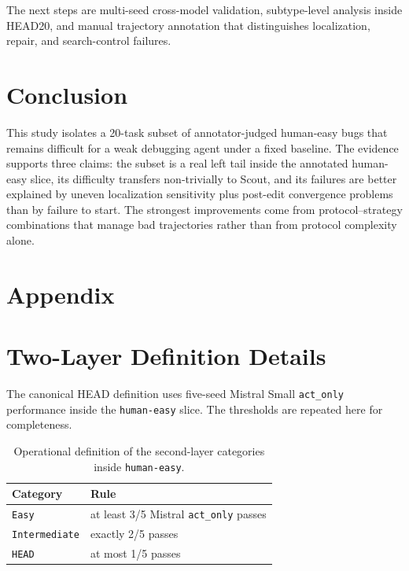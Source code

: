 \documentclass{article}
\begin{document}
The next steps are multi-seed cross-model validation, subtype-level analysis inside HEAD20, and manual trajectory annotation that distinguishes localization, repair, and search-control failures.

\section{Conclusion}

This study isolates a 20-task subset of annotator-judged human-easy bugs that remains difficult for a weak debugging agent under a fixed baseline. The evidence supports three claims: the subset is a real left tail inside the annotated human-easy slice, its difficulty transfers non-trivially to Scout, and its failures are better explained by uneven localization sensitivity plus post-edit convergence problems than by failure to start. The strongest improvements come from protocol--strategy combinations that manage bad trajectories rather than from protocol complexity alone.

\clearpage



\clearpage
\appendix
\section*{Appendix}

\section{Two-Layer Definition Details}

The canonical HEAD definition uses five-seed Mistral Small \texttt{act\_only} performance inside the \texttt{human-easy} slice. The thresholds are repeated here for completeness.

\begin{table}[H]
\centering
\caption{Operational definition of the second-layer categories inside \texttt{human-easy}.}
\label{tab:defdetails}
\begin{tabular}{ll}
\toprule
Category & Rule \\
\midrule
\texttt{Easy} & at least 3/5 Mistral \texttt{act\_only} passes \\
\texttt{Intermediate} & exactly 2/5 passes \\
\texttt{HEAD} & at most 1/5 passes \\
\bottomrule
\end{tabular}
\end{table}
\end{document}

